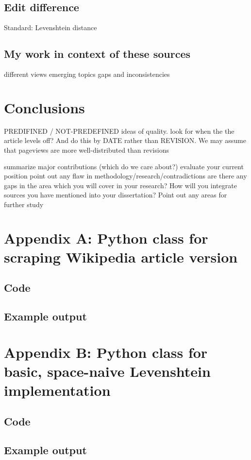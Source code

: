 \documentclass[a4paper,11pt,twoside,notitlepage]{article}
\begin{document}
        \subsection{Edit difference}

        Standard: Levenshtein distance \cite{Levenshtein1966}
        
        \subsection{My work in context of these sources}
        different views
        emerging topics
        gaps and inconsistencies

        \section{Conclusions}

        PREDIFINED / NOT-PREDEFINED ideas of quality. look for when
        the the article levels off? And do this by DATE rather than
        REVISION. We may assume that pageviews are more
        well-distributed than revisions

        summarize major contributions (which do we care about?)
        evaluate your current position
        point out any flaw in methodology/research/contradictions
        are there any gaps in the area which you will cover in your research?
        How will you integrate sources you have mentioned into your dissertation?
        Point out any areas for further study

\clearpage
\begin{appendices}
\section{Appendix A: Python class for scraping Wikipedia article version}
\subsection{Code}

\subsection{Example output}

\clearpage
\section{Appendix B: Python class for basic, space-naive Levenshtein
  implementation}
\subsection{Code}

\subsection{Example output}
\end{appendices}

{}
	
\end{document}
